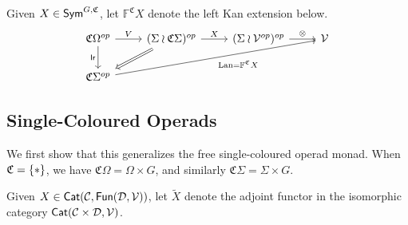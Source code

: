 \documentclass[psamsfonts,onesided,10pt
,draft
]{amsart}%
\begin{document}
\begin{definition}
      Given $X \in \mathsf{Sym}^{G, \mathfrak C}$, let $\mathbb F^{\mathfrak C} X$ denote the left Kan extension below.
      \begin{equation} 
           \begin{tikzcd}
                  \mathfrak C \Omega^{op}
                  \arrow[d, "\mathsf{lr}"']
                  \arrow[r, "V"]
                  &
                  (\Sigma \wr \mathfrak C \Sigma)^{op} \arrow[r, "X"]
                  \arrow[dl, Rightarrow]
                  &
                  (\Sigma \wr \V^{op})^{op} \arrow[r, "\otimes"]
                  &
                  \V
                  \\
                  \mathfrak C \Sigma^{op} \arrow[urrr, "\Lan = \mathbb F^{\mathfrak C} X"']
            \end{tikzcd}
      \end{equation}
\end{definition}


\subsection{Single-Coloured Operads}
We first show that this generalizes the free single-coloured operad monad.
When $\mathfrak C = \set{\**}$, we have
$\mathfrak C \Omega = \Omega \times G$, and similarly
$\mathfrak C \Sigma = \Sigma \times G$.

\begin{notation}
      Given $X \in \mathsf{Cat}(\mathcal{C}, \mathsf{Fun}(\mathcal D, \mathcal V))$,
      let $\tilde X$ denote the adjoint functor in the isomorphic category $\mathsf{Cat}(\mathcal{C} \times \mathcal D, \mathcal V)$.
\end{notation}
\end{document}
